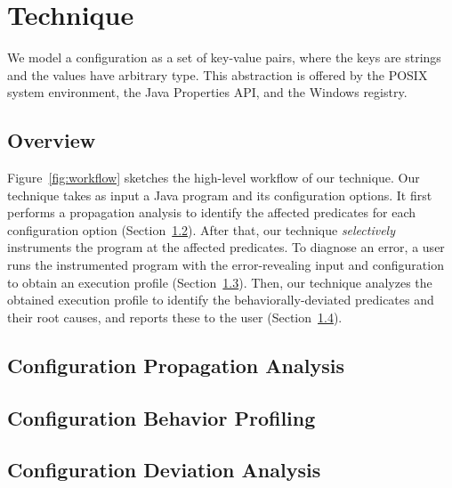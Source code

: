 \section{Technique}
\label{sec:technique}

We model a configuration as a set of key-value pairs, where
the keys are strings and the values have arbitrary type. This
abstraction is offered
by the POSIX system environment, the Java Properties API,
and the Windows registry.


\subsection{Overview}

Figure~\ref{fig:workflow} sketches the high-level workflow of our technique.
Our technique takes as input a Java program and its configuration options.
It first performs a propagation analysis to identify
the affected predicates for each configuration option (Section~\ref{sec:prop}).
After that, our technique \textit{selectively} instruments
the program at the affected predicates. 
To diagnose an error, a user runs the instrumented program
with the error-revealing input and configuration
to obtain an execution profile (Section~\ref{sec:profiling}).
Then, our technique analyzes the obtained execution profile
to identify the behaviorally-deviated predicates and their
root causes, and reports these to the user (Section~\ref{sec:analysis}).



\tinysqueeze

\subsection{Configuration Propagation Analysis}
\label{sec:prop}
\tinysqueeze


\tinysqueeze
\subsection{Configuration Behavior Profiling}
\label{sec:profiling}
\tinysqueeze



\tinysqueeze

\subsection{Configuration Deviation Analysis}
\label{sec:analysis}
\tinysqueeze




